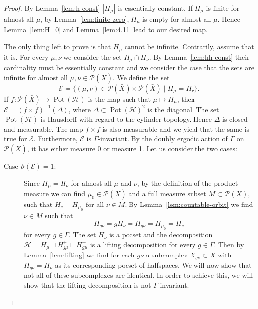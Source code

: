 \begin{proof}
  By Lemma~\ref{lem:h-const} \(|H_\mu|\) is essentially constant.
  If \(H_\mu\) is finite for almost all \(\mu\), by Lemma~\ref{lem:finite-zero}, \(H_\mu\) is empty for almost all \(\mu\). Hence Lemma~\ref{lem:H=0} and Lemma~\ref{lem:4.11} lead to our desired map.

  The only thing left to prove is that \(H_\mu\) cannot be infinite. Contrarily, assume that it is. For every \(\mu, \nu\) we consider the set \(H_\mu \cap H_\nu\). By Lemma~\ref{lem:hh-const} their cardinality must be essentially constant and we consider the case that the sets are infinite for almost all \(\mu, \nu \in \mathcal{P}(\bar X)\).
  We define the set
  \[
    \mathcal{E} \coloneqq \{(\mu, \nu) \in \mathcal{P}(\bar X) \times \mathcal{P}(\bar X)\mid H_\mu = H_\nu\}.
  \]
  If \(f\colon \mathcal{P}(\bar X) \to \operatorname{Pot}(\mathcal{H})\) is the map such that  \(\mu \mapsto H_\mu\), then \(\mathcal{E} = (f \times f)^{-1}(\Delta)\), where \(\Delta \subset \operatorname{Pot}(\mathcal{H})^2\) is the diagonal. The set \(\operatorname{Pot}(\mathcal{H})\) is Hausdorff with regard to the cylinder topology. Hence \(\Delta\) is closed and measurable. The map \(f \times f\) is also measurable and we yield that the same is true for \(\mathcal{E}\). Furthermore, \(\mathcal{E}\) is \(\Gamma\)-invariant.  By the doubly ergodic action of \(\Gamma\) on \(\mathcal{P}(\bar X)\), it has either measure 0 or measure 1. Let us consider the two cases:
  \begin{description}
  \item[Case \(\vartheta(\mathcal{E})=1\):] Since \(H_\mu = H_\nu\) for almost all \(\mu\) and \(\nu\), by the definition of the product measure we can find \(\mu_0 \in \mathcal{P}(\bar X)\) and a full measure subset \(M \subset \mathcal{P}(X)\), such that \(H_\nu = H_{\mu_0}\) for all \(\nu \in M\). By Lemma~\ref{lem:countable-orbit} we find \(\nu \in M\) such that
    \[
      H_{g\nu} = gH_\nu = H_{g\nu} = H_{\mu_0} = H_\nu
    \]
    for every \(g \in \Gamma\). The set \(H_\nu\) is a pocset and the decomposition \(\mathcal{H} = H_\mu \sqcup H_{g\mu}^+ \sqcup H_{g\mu}^-\) is a lifting decomposition for every \(g \in \Gamma\). Then by Lemma~\ref{lem:lifting} we find for each \(g\nu\) a subcomplex \(\bar X_{g\nu} \subset \bar X\) with \(H_{g\nu} = H_\nu\) as its corresponding pocset of halfspaces. We will now show that not all of these subcomplexes are identical. In order to achieve this, we will show that the lifting decomposition is not \(\Gamma\)-invariant.


\end{description}
\end{proof}
